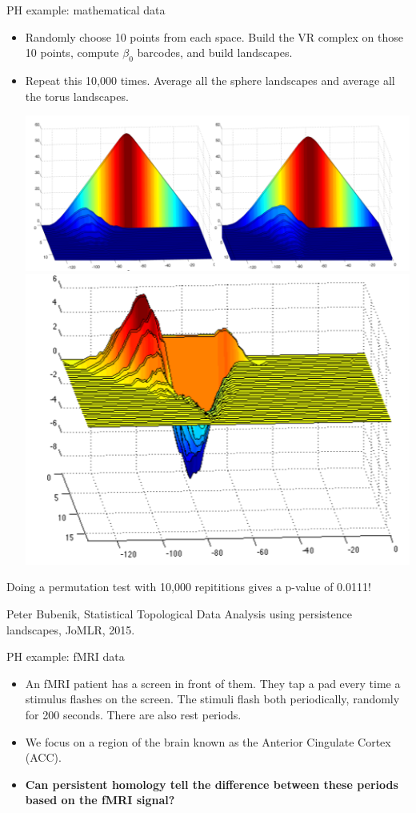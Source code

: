 \documentclass[usenames,dvipsnames,aspectratio=1610]{beamer}
\begin{document}
\begin{frame}{PH example: mathematical data}
  \begin{itemize}
    \item Randomly choose 10 points from each space. Build the VR complex on 
      those 10 points, compute $\beta_0$ barcodes, and build landscapes. 
    \item Repeat this 10,000 times. Average all the sphere landscapes and average
      all the torus landscapes.
      \begin{center}
	\includegraphics[scale=0.4]{pl_compare1.png}
	\pause
	\includegraphics[scale=0.4]{pl_comp2.png}
      \end{center}
  \end{itemize}
  Doing a permutation test with 10,000 repititions gives a p-value of 0.0111!

  {\tiny Peter Bubenik, Statistical Topological Data Analysis using persistence landscapes,
  JoMLR, 2015.}
\end{frame}


\begin{frame}{PH example: fMRI data}
  \begin{itemize}
    \item An fMRI patient has a screen in front of them. They tap
	a pad every time a stimulus flashes on the screen. The stimuli flash both periodically,
	randomly for 200 seconds. There are also rest periods.
      \item We focus on a region of the brain known as the Anterior Cingulate Cortex (ACC).
      \item {\bf Can persistent homology tell the difference between
	these periods based on the fMRI signal?}
  \end{itemize}
\end{frame}
\end{document}
